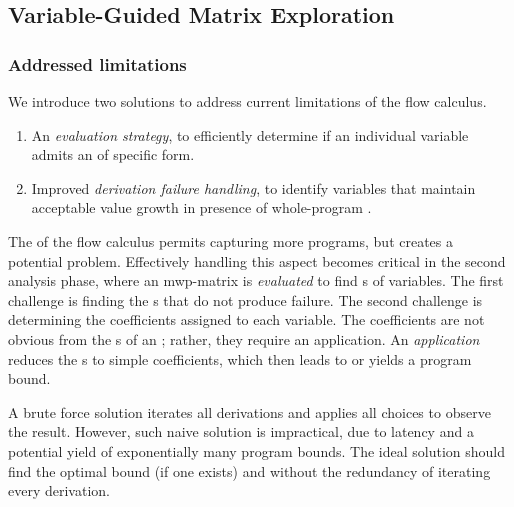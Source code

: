 \subsection{Variable-Guided Matrix Exploration}
\label{sec:enhancements}

\subsubsection{Addressed limitations}
\label{subsec:enhancements}

We introduce two solutions to address current limitations of the flow
calculus.

\begin{enumerate}

\item An  \emph{evaluation strategy}, to efficiently determine
if an individual variable admits an  of specific form.

\item Improved \emph{derivation failure handling}, to identify variables that
maintain acceptable value growth in presence of whole-program .

\end{enumerate}

\noindent The  of the flow calculus
permits capturing more programs, but creates a potential 
problem. Effectively handling this aspect becomes critical in the second
analysis phase, where an mwp-matrix is \emph{evaluated} to find s
of variables. The first challenge is finding the s that
do not produce failure. The second challenge is determining the
coefficients assigned to each variable. The coefficients
are not obvious from the s of an ;
rather, they require an application. An \emph{application} reduces the
s to simple coefficients,
which then leads to  or yields a program bound.

A brute force solution iterates all derivations and applies all choices to
observe the result. However, such naive solution is impractical, due to latency
and a potential yield of exponentially many program bounds. The ideal solution
should find the optimal bound (if one exists) and without the redundancy of
iterating every derivation.

